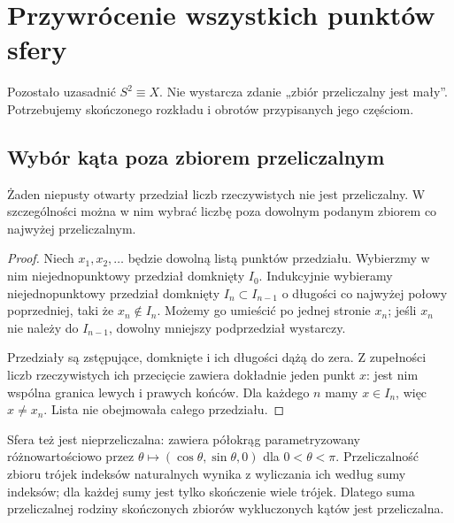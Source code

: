 \section{Przywrócenie wszystkich punktów sfery}
Pozostało uzasadnić $S^2\equiv X$. Nie wystarcza zdanie „zbiór przeliczalny jest mały”. Potrzebujemy skończonego rozkładu i obrotów przypisanych jego częściom.

\subsection{Wybór kąta poza zbiorem przeliczalnym}
\begin{lemat}\label{lem:nieprzeliczalnosc}
Żaden niepusty otwarty przedział liczb rzeczywistych nie jest przeliczalny. W szczególności można w nim wybrać liczbę poza dowolnym podanym zbiorem co najwyżej przeliczalnym.
\end{lemat}
\begin{proof}
Niech $x_1,x_2,\ldots$ będzie dowolną listą punktów przedziału. Wybierzmy w nim niejednopunktowy przedział domknięty $I_0$. Indukcyjnie wybieramy niejednopunktowy przedział domknięty $I_n\subset I_{n-1}$ o długości co najwyżej połowy poprzedniej, taki że $x_n\notin I_n$. Możemy go umieścić po jednej stronie $x_n$; jeśli $x_n$ nie należy do $I_{n-1}$, dowolny mniejszy podprzedział wystarczy.

Przedziały są zstępujące, domknięte i ich długości dążą do zera. Z zupełności liczb rzeczywistych ich przecięcie zawiera dokładnie jeden punkt $x$: jest nim wspólna granica lewych i prawych końców. Dla każdego $n$ mamy $x\in I_n$, więc $x\ne x_n$. Lista nie obejmowała całego przedziału.
\end{proof}
Sfera też jest nieprzeliczalna: zawiera półokrąg parametryzowany różnowartościowo przez $\theta\mapsto(\cos\theta,\sin\theta,0)$ dla $0<\theta<\pi$. Przeliczalność zbioru trójek indeksów naturalnych wynika z wyliczania ich według sumy indeksów; dla każdej sumy jest tylko skończenie wiele trójek. Dlatego suma przeliczalnej rodziny skończonych zbiorów wykluczonych kątów jest przeliczalna.

